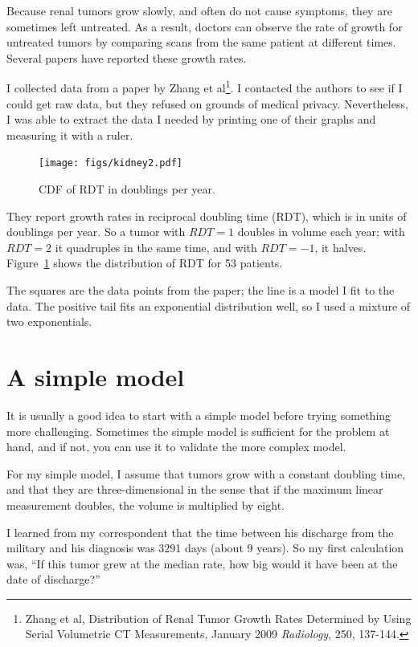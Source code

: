 \documentclass[12pt]{book}
\theoremstyle{exercise}
\begin{document}
Because renal tumors grow slowly, and often do not cause symptoms,
they are sometimes left untreated.  As a result, doctors can observe
the rate of growth for untreated tumors by comparing scans from the
same patient at different times.  Several papers have reported these
growth rates.

I collected data from a paper by Zhang et al\footnote{Zhang et al,
  Distribution of Renal Tumor Growth Rates Determined by Using Serial
  Volumetric CT Measurements, January 2009 {\it Radiology}, 250,
  137-144.}.  I contacted the authors to see if I could get raw data,
but they refused on grounds of medical privacy.  Nevertheless, I was
able to extract the data I needed by printing one of their graphs and
measuring it with a ruler.

\begin{figure}
\centerline{\texttt{[image: figs/kidney2.pdf]}}
\caption{CDF of RDT in doublings per year.}
\label{fig.kidney2}
\end{figure}

They report growth rates in reciprocal doubling time (RDT),
which is in units of doublings per year.  So a tumor with $RDT=1$
doubles in volume each year; with $RDT=2$ it quadruples in the same
time, and with $RDT=-1$, it halves.  Figure~\ref{fig.kidney2} shows the
distribution of RDT for 53 patients.

The squares are the data points from the paper; the line is a model I
fit to the data.  The positive tail fits an exponential distribution
well, so I used a mixture of two exponentials.



\section{A simple model}

It is usually a good idea to start with a simple model before
trying something more challenging.  Sometimes the simple model is
sufficient for the problem at hand, and if not, you can use it
to validate the more complex model.

For my simple model, I assume that tumors grow with a constant
doubling time, and that they are three-dimensional in the sense that
if the maximum linear measurement doubles, the volume is multiplied by
eight.

I learned from my correspondent that the time between his discharge
from the military and his diagnosis was 3291 days (about 9 years).
So my first calculation was, ``If this tumor grew at the median
rate, how big would it have been at the date of discharge?''
\end{document}
